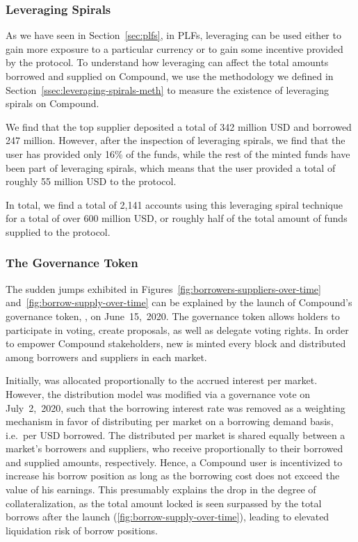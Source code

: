 \subsubsection{Leveraging Spirals}
As we have seen in Section~\ref{sec:plfs}, in PLFs, leveraging can be used either to gain more exposure to a particular currency or to gain some incentive provided by the protocol.
To understand how leveraging can affect the total amounts borrowed and supplied on Compound, we use the methodology we defined in Section~\ref{ssec:leveraging-spirals-meth} to measure the existence of leveraging spirals on Compound.

We find that the top supplier deposited a total of 342 million USD and borrowed 247 million.
However, after the inspection of leveraging spirals, we find that the user has provided only 16\% of the funds, while the rest of the minted funds have been part of leveraging spirals, which means that the user provided a total of roughly 55 million USD to the protocol.

In total, we find a total of 2,141 accounts using this leveraging spiral technique for a total of over 600 million USD, or roughly half of the total amount of funds supplied to the protocol.

\subsubsection{The  Governance Token}
The sudden jumps exhibited in Figures~\ref{fig:borrowers-suppliers-over-time} and~\ref{fig:borrow-supply-over-time} can be explained by the launch of Compound's governance token, , on June~15,~2020.
The  governance token allows holders to participate in voting, create proposals, as well as delegate voting rights.
In order to empower Compound stakeholders, new  is minted every block and distributed among borrowers and suppliers in each market.

Initially,  was allocated proportionally to the accrued interest per market.
However, the  distribution model was modified via a governance vote on July~2,~2020, such that the borrowing interest rate was removed as a weighting mechanism in favor of distributing  per market on a borrowing demand basis, i.e.\ per USD borrowed.
The distributed  per market is shared equally between a market's borrowers and suppliers, who receive  proportionally to their borrowed and supplied amounts, respectively.
Hence, a Compound user is incentivized to increase his borrow position as long as the borrowing cost does not exceed the value of his  earnings. This presumably explains the drop in the degree of collateralization, as the total amount locked is seen surpassed by the total borrows after the  launch (\autoref{fig:borrow-supply-over-time}), leading to elevated liquidation risk of borrow positions.


